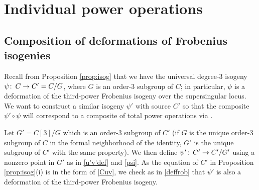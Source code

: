 \documentclass{gtpart}
\theoremstyle{definition}
\theoremstyle{remark}
\def\co{\colon\thinspace}
\newcommand{\isog}[1]{Proposition \ref{prop:isog}\thinspace (#1)}
\begin{document}
\section{Individual power operations}
\label{sec:individual}

\subsection{Composition of deformations of Frobenius isogenies}

Recall from Proposition \ref{prop:isog} that we have the universal degree-3 isogeny $\psi \co C \to C' = C/G$, where $G$ is an order-3 subgroup of $C$; 
in particular, $\psi$ is a deformation of the third-power Frobenius isogeny over the supersingular locus.  
We want to construct a similar isogeny $\psi'$ with source $C'$ 
so that the composite $\psi' \circ \psi$ will correspond to a composite of total power operations via \cite[Theorem B]{cong}.  

Let $G' = C[3]/G$ which is an order-3 subgroup of $C'$ 
(if $G$ is the unique order-3 subgroup of $C$ in the formal neighborhood of the identity, $G'$ is the unique subgroup of $C'$ with the same property).  
We then define $\psi' \co C' \to C'/G'$ using a nonzero point in $G'$ as in \eqref{u'v'def} and \eqref{psi}.  
As the equation of $C'$ in \isog{i} is in the form of \eqref{Cuv}, 
we check as in \eqref{deffrob} that $\psi'$ is also a deformation of the third-power Frobenius isogeny.  
\end{document}
